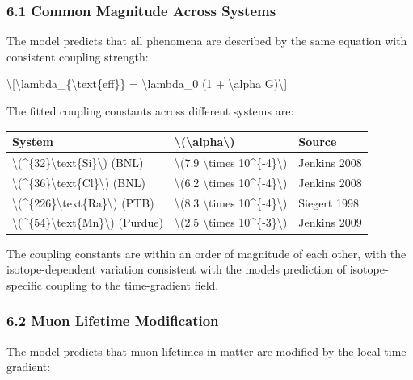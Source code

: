 \documentclass[
  10pt,
]{article}
\begin{document}
\hypertarget{common-magnitude-across-systems}{%
\subsubsection{6.1 Common Magnitude Across
Systems}\label{common-magnitude-across-systems}}

The model predicts that all phenomena are described by the same equation
with consistent coupling strength:

\textbackslash{[}\textbackslash lambda\_\{\textbackslash text\{eff\}\} =
\textbackslash lambda\_0 (1 + \textbackslash alpha G)\textbackslash{]}

The fitted coupling constants across different systems are:

\begin{longtable}[]{@{}lll@{}}
\toprule\noalign{}
System & \textbackslash(\textbackslash alpha\textbackslash) & Source \\
\midrule\noalign{}
\endhead
\bottomrule\noalign{}
\endlastfoot
\textbackslash(\^{}\{32\}\textbackslash text\{Si\}\textbackslash) (BNL)
& \textbackslash(7.9 \textbackslash times 10\^{}\{-4\}\textbackslash) &
Jenkins 2008 \\
\textbackslash(\^{}\{36\}\textbackslash text\{Cl\}\textbackslash) (BNL)
& \textbackslash(6.2 \textbackslash times 10\^{}\{-4\}\textbackslash) &
Jenkins 2008 \\
\textbackslash(\^{}\{226\}\textbackslash text\{Ra\}\textbackslash) (PTB)
& \textbackslash(8.3 \textbackslash times 10\^{}\{-4\}\textbackslash) &
Siegert 1998 \\
\textbackslash(\^{}\{54\}\textbackslash text\{Mn\}\textbackslash)
(Purdue) & \textbackslash(2.5 \textbackslash times
10\^{}\{-3\}\textbackslash) & Jenkins 2009 \\
\end{longtable}

The coupling constants are within an order of magnitude of each other,
with the isotope-dependent variation consistent with the
model\textquotesingle s prediction of isotope-specific coupling to the
time-gradient field.

\hypertarget{muon-lifetime-modification}{%
\subsubsection{6.2 Muon Lifetime
Modification}\label{muon-lifetime-modification}}

The model predicts that muon lifetimes in matter are modified by the
local time gradient:
\end{document}
